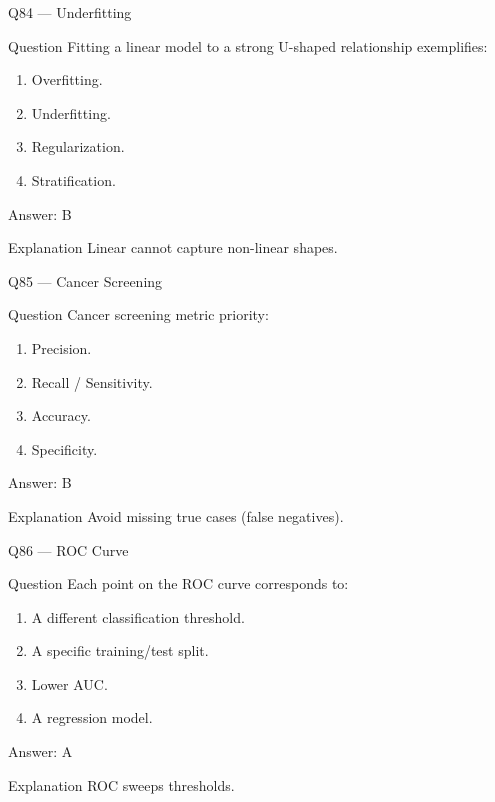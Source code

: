 \documentclass[aspectratio=169,8pt]{beamer}
\begin{document}
	\begin{frame}{Q84 --- Underfitting}
		\begin{block}{Question}
			Fitting a linear model to a strong U-shaped relationship exemplifies:
		\end{block}
		\begin{enumerate}
			\item Overfitting.
			\item Underfitting.
			\item Regularization.
			\item Stratification.
		\end{enumerate}
		\begin{exampleblock}{Answer: B}\end{exampleblock}
		\begin{block}{Explanation}
			Linear cannot capture non-linear shapes.
		\end{block}
	\end{frame}
	
	\begin{frame}{Q85 --- Cancer Screening}
		\begin{block}{Question}
			Cancer screening metric priority:
		\end{block}
		\begin{enumerate}
			\item Precision.
			\item Recall / Sensitivity.
			\item Accuracy.
			\item Specificity.
		\end{enumerate}
		\begin{exampleblock}{Answer: B}\end{exampleblock}
		\begin{block}{Explanation}
			Avoid missing true cases (false negatives).
		\end{block}
	\end{frame}
	
	\begin{frame}{Q86 --- ROC Curve}
		\begin{block}{Question}
			Each point on the ROC curve corresponds to:
		\end{block}
		\begin{enumerate}
			\item A different classification threshold.
			\item A specific training/test split.
			\item Lower AUC.
			\item A regression model.
		\end{enumerate}
		\begin{exampleblock}{Answer: A}\end{exampleblock}
		\begin{block}{Explanation}
			ROC sweeps thresholds.
		\end{block}
	\end{frame}
	
\end{document}
